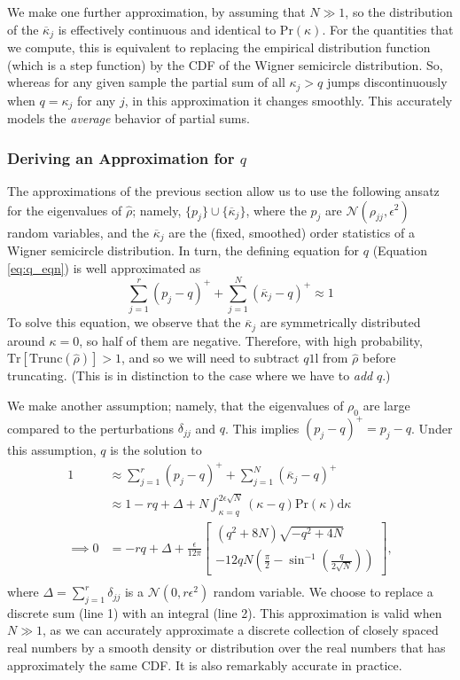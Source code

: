\documentclass[aps,pra, twocolumn]{revtex4-1}
\newcommand{\Tr}{\mathrm{Tr}}
\def\Id{1\!\mathrm{l}}
\begin{document}
We make one further approximation, by assuming that $N\gg1$, so the distribution of the $\overline{\kappa}_j$ is effectively continuous and identical to $\mathrm{Pr}(\kappa)$. For the quantities that we compute, this is equivalent to replacing the empirical distribution function (which is a step function) by the CDF of the Wigner semicircle distribution.  So, whereas for any given sample the partial sum of all $\kappa_j > q$ jumps discontinuously when $q=\kappa_j$ for any $j$, in this approximation it changes smoothly.  This accurately models the \emph{average} behavior of partial sums.

\subsubsection{Deriving an Approximation for $q$}
The approximations of the previous section allow us to use the following ansatz for the eigenvalues of $\hat\rho$; namely, $\{p_j\} \cup \{\overline{\kappa}_j\}$, where the $p_j$ are $\mathcal{N}(\rho_{jj},\epsilon^2)$ random variables, and the $\overline{\kappa}_j$ are the (fixed, smoothed) order statistics of a Wigner semicircle distribution.  In turn, the defining equation for $q$ (Equation \eqref{eq:q_eqn}) is well approximated as
\begin{equation}
\sum_{j=1}^{r}(p_j - q)^{+} + \sum_{j=1}^{N}{(\overline{\kappa}_j-q)^+} \approx 1
\end{equation}
To solve this equation, we observe that the $\overline{\kappa}_j$ are symmetrically distributed around $
\kappa=0$, so half of them are negative.  Therefore, with high probability, $\Tr
\left[\mathrm{Trunc}(\hat\rho)\right]>1$, and so we will need to subtract $q\Id$ from $\hat\rho$ before truncating. (This is in distinction to the case where we have to \emph{add} $q$.)

We make another assumption; namely, that the eigenvalues of $\rho_{0}$ are large compared to the perturbations $\delta_{jj}$ and $q$. This implies $(p_{j} - q)^{+} = p_{j} - q$. Under this assumption, $q$ is the solution to
\begin{align}
\nonumber 1 &\approx \sum_{j=1}^{r}(p_j - q)^{+} + \sum_{j=1}^{N}{(\overline{\kappa}_j-q)^+}\\
\nonumber &\approx 1 - rq + \Delta + N\int_{\kappa=q}^{2\epsilon\sqrt{N}}{(\kappa-q)\mathrm{Pr}(\kappa)\mathrm{d}\kappa}\\
\label{eq:q_eqn2}\implies 0 &= - rq + \Delta + \frac{\epsilon}{12\pi}\left[
\begin{array}{l} (q^2+8N)\sqrt{-q^2+4N} \\
-12qN\left(\frac{\pi}{2}-\sin^{-1}\left(\frac{q}{2\sqrt{N}}\right)\right)
\end{array}\right],\nonumber\\
~
\end{align}
where $\Delta = \sum_{j=1}^{r}\delta_{jj}$ is a $\mathcal{N}(0,r\epsilon^2)$ random variable.  We choose to replace a discrete 
sum (line 1) with an integral (line 2). This approximation is valid when $N\gg1$, as we can accurately approximate a discrete collection of closely spaced real numbers by a smooth density or distribution over the real numbers that has approximately the same CDF.  It is also remarkably accurate in practice.
  
\end{document}
